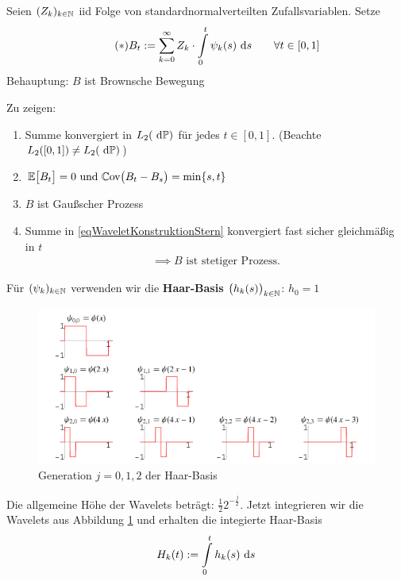 \begin{theorem}\label{theorem10.2}
	Seien $(Z_k)_{k\in\mathbb{N}}$ iid Folge von standardnormalverteilten Zufallsvariablen. Setze
	\begin{align}\label{eqWaveletKonstruktionStern}\tag{$\ast$}
		B_t:=\sum\limits_{k=0}^\infty Z_k\cdot\int\limits_0^t\psi_k(s)\text{ d} s\qquad\forall t\in[0,1]
	\end{align}
	Behauptung: $B$ ist Brownsche Bewegung
\end{theorem}

Zu zeigen:
\begin{enumerate}[label=\alph*)]
	\item Summe konvergiert in $L_2(\text{ d}\mathbb{P})$ für jedes $t\in[0,1]$. (Beachte $L_2([0,1])\neq L_2(\text{ d}\mathbb{P})$)
	\item $\begin{aligned}
		\mathbb{E}\big[B_t\big]=0\text{ und }\mathbb{C}\text{ov}\big(B_t-B_s\big)=\min\lbrace s,t\rbrace
	\end{aligned}$
	\item $B$ ist Gaußscher Prozess
	\item Summe in \eqref{eqWaveletKonstruktionStern} konvergiert fast sicher gleichmäßig in $t$
	\begin{align*}
		\implies B\text{ ist stetiger Prozess.}
	\end{align*}
\end{enumerate}

Für $(\psi_k)_{k\in\mathbb{N}}$ verwenden wir die \textbf{Haar-Basis} $\big(h_k(s)\big)_{k\in\mathbb{N}}$: $h_0 = 1$

\begin{figure}[H]
	\begin{center}
		\includegraphics[width=1\textwidth]{./pics/Haar.png}
		\caption{Generation $j=0,1,2$ der Haar-Basis}
		\label{AbbHaarBasis}
	\end{center}
\end{figure}
Die allgemeine Höhe der Wavelets beträgt: $\frac{1}{2}2^{-\frac{j}{2}}$.
Jetzt integrieren wir die Wavelets aus Abbildung \ref{AbbHaarBasis} und erhalten die integierte Haar-Basis
\begin{align*}
	H_k(t):=\int\limits_0^t h_k(s)\text{ d} s
\end{align*}

